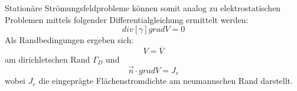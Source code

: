  Stationäre Strömungsfeldprobleme können somit analog zu elektrostatischen Problemen mittels folgender Differentialgleichung ermittelt werden:
 \begin{equation}
\mathit{div}[\gamma]\mathit{grad}V = 0
 \end{equation}
 Als Randbedingungen ergeben sich:
 \begin{equation}
 \label{eq:current_dirichlet_condition}
 V = \overline{V}
 \end{equation}
 am dirichletschen Rand $\Gamma_D$ und 
 \begin{equation}
 \label{eq:current_neumann_condition}
 \vec{n}\cdot\mathit{grad}V = J_e
 \end{equation}
 wobei $J_e$ die eingeprägte Flächenstromdichte am neumannschen Rand darstellt.


